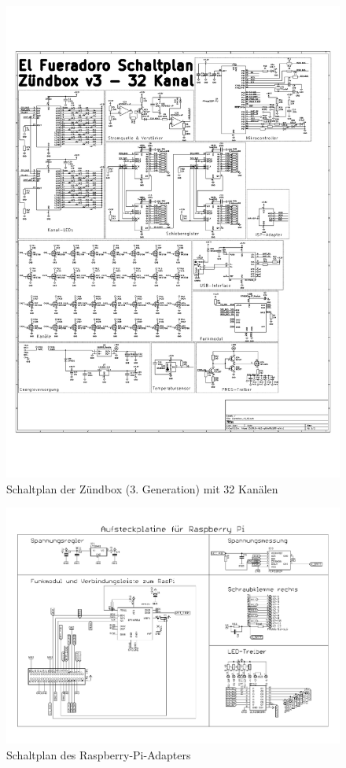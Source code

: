 \documentclass[paper=a4, parskip, numbers=noenddot, toc=listof, headsepline]{scrbook}
\begin{document}
		\begin{figure}
			\centering
			\includegraphics[width=.95\textwidth,keepaspectratio]{Bilder/Zuendboxschaltplan332}
			\caption{Schaltplan der Zündbox (3. Generation) mit 32 Kanälen}
			\label{fig:zuendbox332schematic}
		\end{figure}

		\begin{figure}
			\centering
			\includegraphics[angle=90,totalheight=.95\textheight,keepaspectratio]{Bilder/Piadapterschaltplan}
			\caption{Schaltplan des Raspberry-Pi-Adapters}
			\label{fig:piadapterschematic}
		\end{figure}
\end{document}
